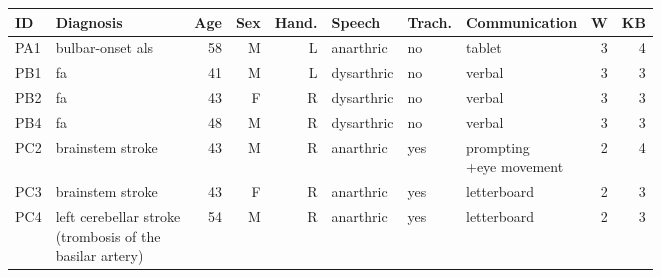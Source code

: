 \footnotesize
\begin{tabular}{@{}llrrrlllrr@{}}
  \toprule
  \textbf{ID}  & \textbf{Diagnosis} & \textbf{Age} & \textbf{Sex} & \textbf{Hand.} &
  \textbf{Speech} & \textbf{Trach.} & \textbf{Communication} &
  \textbf{W} & \textbf{KB} \\ \midrule
  PA1 & bulbar-onset \acs{als} & 58  & M   & L     & anarthric  & no          & tablet                 & 3  & 4 \\
  PB1 & \acs{fa} & 41  & M   & L     & dysarthric & no          & verbal                 & 3  & 3 \\
  PB2 & \acs{fa} & 43  & F   & R     & dysarthric & no          & verbal                 & 3  & 3 \\
  PB4 & \acs{fa} & 48  & M   & R     & dysarthric & no          & verbal                 & 3  & 3 \\
  PC2 & brainstem stroke & 43  & M   & R     & anarthric  & yes         &  \makecell[l]{prompting\\+eye movement} & 2 & 4  \\
  PC3 & brainstem stroke & 43  & F   & R     & anarthric  & yes         & letterboard            & 2  & 3 \\
  PC4 & \makecell[l]{left cerebellar stroke \\ (trombosis of the  \\ basilar  artery)} & 54  & M   & R     & anarthric  & yes & letterboard & 2 & 3 \\
  \bottomrule
\end{tabular}
